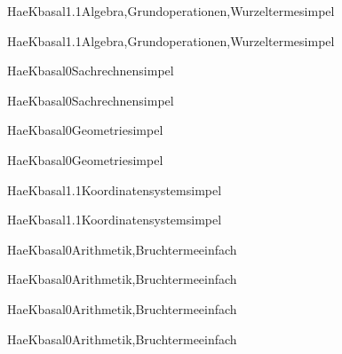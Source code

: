 \documentclass[12pt]{article}
\begin{document}
\begin{Add}{HaeK}{basal1.1}{Algebra,Grundoperationen,Wurzelterme}{simpel}
\solution{ }
\end{Add}
\begin{Add}{HaeK}{basal1.1}{Algebra,Grundoperationen,Wurzelterme}{simpel}
\end{Add}

\begin{Add}{HaeK}{basal0}{Sachrechnen}{simpel}
\solution{ }
\end{Add}
\begin{Add}{HaeK}{basal0}{Sachrechnen}{simpel}
\end{Add}

\begin{Add}{HaeK}{basal0}{Geometrie}{simpel}
\solution{ }
\end{Add}
\begin{Add}{HaeK}{basal0}{Geometrie}{simpel}
\end{Add}

\begin{Add}{HaeK}{basal1.1}{Koordinatensystem}{simpel}
\solution{ }
\end{Add}
\begin{Add}{HaeK}{basal1.1}{Koordinatensystem}{simpel}
\end{Add}

\begin{Add}{HaeK}{basal0}{Arithmetik,Bruchterme}{einfach}
\solution{ }
\end{Add}
\begin{Add}{HaeK}{basal0}{Arithmetik,Bruchterme}{einfach}
\end{Add}

\begin{Add}{HaeK}{basal0}{Arithmetik,Bruchterme}{einfach}
\solution{ }
\end{Add}
\begin{Add}{HaeK}{basal0}{Arithmetik,Bruchterme}{einfach}
\end{Add}
\end{document}
